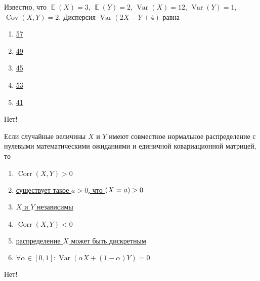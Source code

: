\documentclass[t]{beamer}
\DeclareMathOperator{\Var}{Var}
\DeclareMathOperator{\Cov}{Cov}
\DeclareMathOperator{\Corr}{Corr}
\DeclareMathOperator{\E}{\mathbb{E}}
\let\P\relax
\DeclareMathOperator{\P}{\mathbb{P}}
\begin{document}
 \begin{frame} \label{13-No} 
\begin{block}{13} 

  Известно, что $\E(X)=3$, $\E(Y)=2$, $\Var(X)=12$, $\Var(Y)=1$, $\Cov(X,Y)=2$. Дисперсия $\Var(2X-Y+4)$ равна
  


 \end{block} 
\begin{enumerate} 
\item[] \hyperlink{13-No}{\beamergotobutton{} 57}
\item[] \hyperlink{13-No}{\beamergotobutton{} 49}
\item[] \hyperlink{13-No}{\beamergotobutton{} 45}
\item[] \hyperlink{13-No}{\beamergotobutton{} 53}
\item[] \hyperlink{13-Yes}{\beamergotobutton{} 41}
\end{enumerate} 

 \alert{Нет!} 
\end{frame} 


 \begin{frame} \label{14-No} 
\begin{block}{14} 

  Если случайные величины $X$ и $Y$ имеют совместное нормальное распределение с нулевыми математическими ожиданиями и единичной ковариационной матрицей, то
  


 \end{block} 
\begin{enumerate} 
\item[] \hyperlink{14-No}{\beamergotobutton{} $\Corr(X,Y)>0$}
\item[] \hyperlink{14-No}{\beamergotobutton{} существует такое $a>0$, что $\P(X=a)>0$}
\item[] \hyperlink{14-Yes}{\beamergotobutton{} $X$ и $Y$ независимы}
\item[] \hyperlink{14-No}{\beamergotobutton{} $\Corr(X,Y)<0$}
\item[] \hyperlink{14-No}{\beamergotobutton{} распределение $X$ может быть дискретным}
\item[] \hyperlink{14-No}{\beamergotobutton{} $\forall \alpha \in [0,1]: \Var(\alpha X + (1-\alpha)Y) = 0$}
\end{enumerate} 

 \alert{Нет!} 
\end{frame} 
\end{document}
